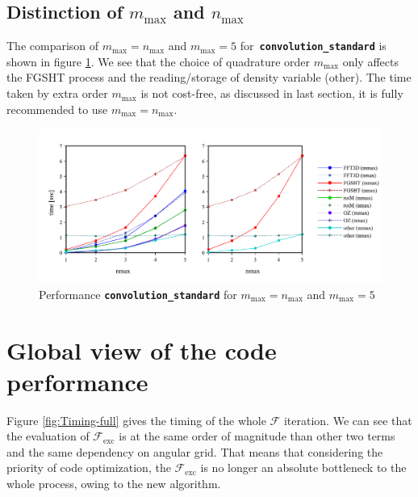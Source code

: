 \subsection{Distinction of $m_{\max}$ and $n_{\max}$}

The comparison of $m_{\max}=n_{\max}$ and $m_{\max}=5$ for\texttt{\textbf{
convolution\_standard}} is shown in figure \ref{fig:comparison-nmax}.
We see that the choice of quadrature order $m_{\max}$ only affects
the \acs{FGSHT} process and the reading/storage of density variable
(other). The time taken by extra order $m_{\max}$ is not cost-free,
as discussed in last section, it is fully recommended to use $m_{\max}=n_{\max}$.

\begin{figure}[H]
\begin{centering}
\includegraphics[bb=20bp 20bp 639bp 268bp,width=1\columnwidth]{_figure/results/nmax}
\par\end{centering}
\caption[Performance comparison of ``convolution\_standard'' for $m_{\max}=n_{\max}$
and $m_{\max}=5$]{Performance \texttt{\textbf{convolution\_standard}} for $m_{\max}=n_{\max}$
and $m_{\max}=5$\label{fig:comparison-nmax}}
\end{figure}


\section{Global view of the code performance}

Figure \ref{fig:Timing-full} gives the timing of the whole $\mathcal{F}$
iteration. We can see that the evaluation of $\mathcal{F}_{\mathrm{exc}}$
is at the same order of magnitude than other two terms and the same
dependency on angular grid. That means that considering the priority
of code optimization, the $\mathcal{F}_{\mathrm{exc}}$ is no longer
an absolute bottleneck to the whole process, owing to the new algorithm.

